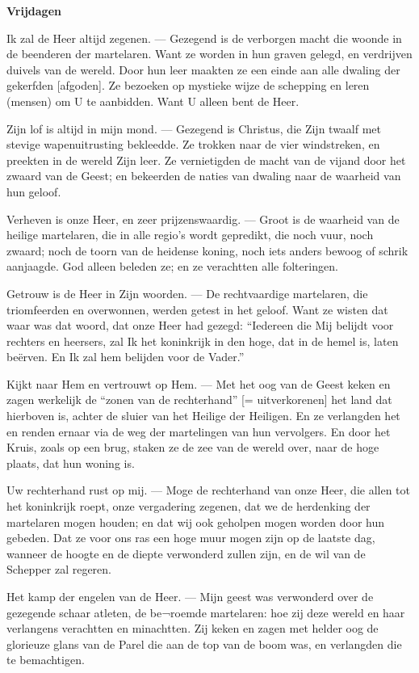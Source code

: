 \documentclass[12pt,twoside,a5paper]{article}
\newlength{\origparskip}
\newenvironment{halfparskip}{
  \setlength{\parskip}{0.5\origparskip}
}{
  \setlength{\parskip}{\origparskip}
}
\newcommand{\liturgicaloption}[1]{{\color{BrickRed}\textbf{#1}}}
\newcommand{\markedday}[1]{%
  \liturgicaloption{#1}%
  \markright{#1}%
}
\begin{document}
\markedday{Vrijdagen}

\begin{halfparskip}
  Ik zal de Heer altijd zegenen. --- Gezegend is de verborgen macht die woonde in de beenderen der martelaren. Want ze worden in hun graven gelegd, en verdrijven duivels van de wereld. Door hun leer maakten ze een einde aan alle dwaling der gekerfden [afgoden]. Ze bezoeken op mystieke wijze de schepping en leren (mensen) om U te aanbidden. Want U alleen bent de Heer.

  Zijn lof is altijd in mijn mond. --- Gezegend is Christus, die Zijn twaalf met stevige wapenuitrusting bekleedde. Ze trokken naar de vier windstreken, en preekten in de wereld Zijn leer. Ze vernietigden de macht van de vijand door het zwaard van de Geest; en bekeerden de naties van dwaling naar de waarheid van hun geloof.

  Verheven is onze Heer, en zeer prijzenswaardig. --- Groot is de waarheid van de heilige martelaren, die in alle regio's wordt gepredikt, die noch vuur, noch zwaard; noch de toorn van de heidense koning, noch iets anders bewoog of schrik aanjaagde. God alleen beleden ze; en ze verachtten alle folteringen.

  Getrouw is de Heer in Zijn woorden. --- De rechtvaardige martelaren, die triomfeerden en overwonnen, werden getest in het geloof. Want ze wisten dat waar was dat woord, dat onze Heer had gezegd: ``Iedereen die Mij belijdt voor rechters en heersers, zal Ik het koninkrijk in den hoge, dat in de hemel is, laten beërven. En Ik zal hem belijden voor de Vader.''

  Kijkt naar Hem en vertrouwt op Hem. --- Met het oog van de Geest keken en zagen werkelijk de ``zonen van de rechterhand'' [= uitverkorenen] het land dat hierboven is, achter de sluier van het Heilige der Heiligen. En ze verlangden het en renden ernaar via de weg der martelingen van hun vervolgers. En door het Kruis, zoals op een brug, staken ze de zee van de wereld over, naar de hoge plaats, dat hun woning is.

  Uw rechterhand rust op mij. ---  Moge de rechterhand van onze Heer, die allen tot het koninkrijk roept, onze vergadering zegenen, dat we de herdenking der martelaren mogen houden; en dat wij ook geholpen mogen worden door hun gebeden. Dat ze voor ons ras een hoge muur mogen zijn op de laatste dag, wanneer de hoogte en de diepte verwonderd zullen zijn, en de wil van de Schepper zal regeren.

  Het kamp der engelen van de Heer. --- Mijn geest was verwonderd over de gezegende schaar atleten, de be¬roemde martelaren: hoe zij deze wereld en haar verlangens verachtten en minachtten. Zij keken en zagen met helder oog de glorieuze glans van de Parel die aan de top van de boom was, en verlangden die te bemachtigen.


\end{halfparskip}
\end{document}
